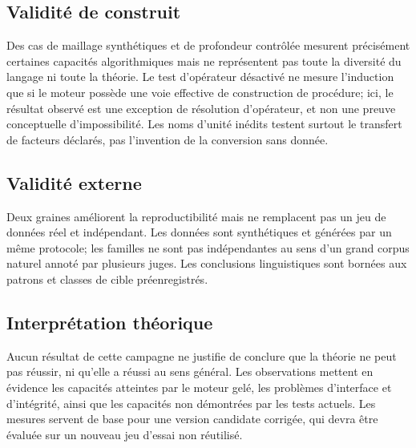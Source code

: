 \documentclass[11pt,a4paper]{article}
\begin{document}
\subsection{Validité de construit}
Des cas de maillage synthétiques et de profondeur contrôlée mesurent précisément certaines capacités algorithmiques mais ne représentent pas toute la diversité du langage ni toute la théorie. Le test d’opérateur désactivé ne mesure l’induction que si le moteur possède une voie effective de construction de procédure; ici, le résultat observé est une exception de résolution d’opérateur, et non une preuve conceptuelle d’impossibilité. Les noms d’unité inédits testent surtout le transfert de facteurs déclarés, pas l’invention de la conversion sans donnée.

\subsection{Validité externe}
Deux graines améliorent la reproductibilité mais ne remplacent pas un jeu de données réel et indépendant. Les données sont synthétiques et générées par un même protocole; les familles ne sont pas indépendantes au sens d’un grand corpus naturel annoté par plusieurs juges. Les conclusions linguistiques sont bornées aux patrons et classes de cible préenregistrés.

\subsection{Interprétation théorique}
Aucun résultat de cette campagne ne justifie de conclure que la théorie ne peut pas réussir, ni qu’elle a réussi au sens général. Les observations mettent en évidence les capacités atteintes par le moteur gelé, les problèmes d’interface et d’intégrité, ainsi que les capacités non démontrées par les tests actuels. Les mesures servent de base pour une version candidate corrigée, qui devra être évaluée sur un nouveau jeu d’essai non réutilisé.
\end{document}
